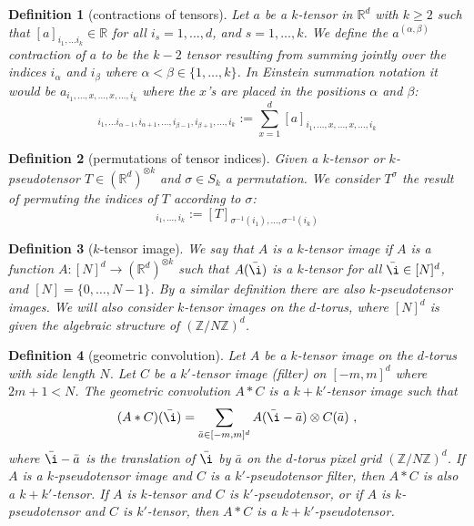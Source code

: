 \documentclass{article}
\theoremstyle{plain}
\newtheorem{definition}{Definition}
\begin{document}
\begin{definition}[contractions of tensors]
Let $a$ be a $k$-tensor in $\mathbb R^d$ with $k\geq 2$ such that $[a]_{i_1,\ldots i_k}\in \mathbb R$ for all $i_s = 1,\ldots, d$, and $s=1,\ldots, k$. We define the $a^{(\alpha,\beta)}$ contraction of $a$ to be the $k-2$ tensor resulting from summing jointly over the indices $i_\alpha$ and $i_\beta$ where $\alpha < \beta \in\{1,\ldots, k\}$. In Einstein summation notation it would be $a_{i_1, \ldots, x, \ldots , x, \ldots, i_k}$ where the $x$'s are placed in the positions $\alpha$ and $\beta$:
\begin{equation}
[a^{(\alpha,\beta)}]_{i_1,\ldots i_{\alpha-1}, i_{\alpha+1}, \ldots, i_{\beta-1}, i_{\beta+1} , \ldots, i_k} := \sum_{x=1}^d [a]_{i_1, \ldots, x, \ldots , x, \ldots, i_k}
\end{equation}
\end{definition}

\begin{definition}[permutations of tensor indices]
Given a $k$-tensor or $k$-pseudotensor $T\in (\mathbb R^d)^{\otimes k}$ and $\sigma\in S_k$ a permutation. We consider $T^\sigma$ the result of permuting the indices of $T$ according to $\sigma$:
\begin{equation}
    [T^\sigma]_{i_1, \ldots, i_k} := [T]_{\sigma^{-1}(i_1), \ldots, \sigma^{-1}(i_k)}
\end{equation}
\end{definition}

\begin{definition}[$k$-tensor image]
We say that $A$ is a $k$-tensor image if $A$ is a function $A: [N]^d \to (\mathbb R^d)^{\otimes k}$ such that $A(\bar \i)$ is a $k$-tensor for all $\bar \i \in [N]^d$, and $[N]=\{0,\ldots, N-1\}$.
By a similar definition there are also $k$-pseudotensor images.
We will also consider $k$-tensor images on the $d$-torus, where $[N]^d$ is given the algebraic structure of $(\mathbb Z / N\mathbb Z)^d$.
\end{definition}

\begin{definition}[geometric convolution]
Let $A$ be a $k$-tensor image on the $d$-torus with side length $N$.
Let $C$ be a $k'$-tensor image (filter) on $[-m, m]^d$ where $2m+1<N$.
The geometric convolution $A\ast C$ is a $k+k'$-tensor image such that
\begin{equation}
    (A\ast C)(\bar\i) = \sum_{\bar a\in[-m, m]^d} A(\bar\i - \bar a)\otimes C(\bar a) ~,
\end{equation}
where $\bar\i - \bar a$ is the translation of $\bar\i$ by $\bar a$ on the $d$-torus pixel grid $(\mathbb Z / N\mathbb Z)^d$.
If $A$ is a $k$-pseudotensor image and $C$ is a $k'$-pseudotensor filter, then $A\ast C$ is also a $k+k'$-tensor.
If $A$ is $k$-tensor and $C$ is $k'$-pseudotensor, or if $A$ is $k$-pseudotensor and $C$ is $k'$-tensor, then $A\ast C$ is a $k+k'$-pseudotensor.
\end{definition}
\end{document}

